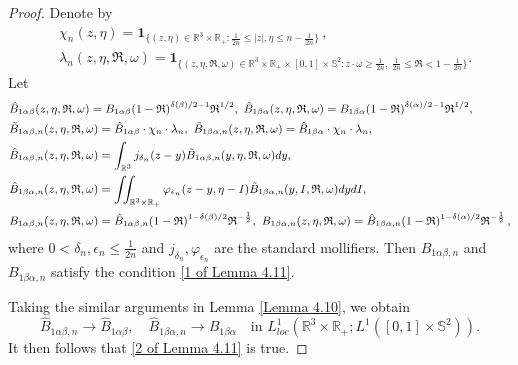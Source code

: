 \documentclass[reqno,11pt]{amsart}
\numberwithin{equation}{section}
\def\R{\mathbb{R}}
\begin{document}
\begin{proof}
	Denote by
	\begin{equation*}
    \begin{aligned}
		& \chi_n (z,\eta ) = \mathbf{1}_{ \{(z,\eta )\in \R^3 \times \R_+ :\frac{1}{2n}\leq |z|,\eta \leq n-\frac{1}{2n} \} } \,, \\
        & \lambda_n(z,\eta ,\mathfrak{R} ,\omega ) = \mathbf{1}_{ \{(z,\eta ,\mathfrak{R} ,\omega )\in \R^3 \times \R_+ \times [0,1] \times \mathbb{S}^2: z\cdot \omega \geq \frac{1}{2n},\ \frac{1}{2n}\leq \mathfrak{R}<1-\frac{1}{2n} \} }.
    \end{aligned}
	\end{equation*}
	Let
\begin{equation*}{\small
\begin{aligned}
  & \hat{B}_{1\alpha \beta}(z,\eta ,\mathfrak{R},\omega )=B_{1\alpha \beta} (1-\mathfrak{R})^{\delta(\beta )/2-1}\mathfrak{R}^{1/2}, \ \hat{B}_{1\beta \alpha}(z,\eta ,\mathfrak{R},\omega )=B_{1\beta \alpha}(1-\mathfrak{R})^{\delta(\alpha )/2-1}\mathfrak{R}^{1/2}, \\
  & \tilde{B}_{1\alpha \beta ,n} (z,\eta ,\mathfrak{R},\omega )=\hat{B}_{1\alpha \beta }\cdot \chi_n \cdot \lambda_n, \ \tilde{B}_{1\beta \alpha ,n} (z,\eta ,\mathfrak{R},\omega )=\hat{B}_{1\beta \alpha }\cdot \chi_n \cdot \lambda_n, \\ 
  & \hat{B}_{1\alpha \beta ,n }(z,\eta,\mathfrak{R},\omega ) =\int_{\R^3} j_{\delta_n }(z-y) \tilde{B}_{1\alpha \beta ,n}(y,\eta,\mathfrak{R},\omega )dy,\\ 
  & \hat{B}_{1\beta \alpha ,n }(z,\eta,\mathfrak{R},\omega ) =\iint_{\R^3 \times \R_+} \varphi_{\epsilon_n }(z-y,\eta-I) \tilde{B}_{1\beta \alpha ,n}(y,I,\mathfrak{R},\omega)dydI,\\
  & B_{1\alpha \beta,n}(z,\eta ,\mathfrak{R},\omega )=\hat{B}_{1\alpha \beta,n} (1-\mathfrak{R})^{1-\delta(\beta )/2}\mathfrak{R}^{-\frac{1}{2}},\ B_{1\beta \alpha,n}(z,\eta ,\mathfrak{R},\omega )=\hat{B}_{1\beta \alpha,n}(1-\mathfrak{R})^{1-\delta(\alpha )/2}\mathfrak{R}^{-\frac{1}{2}} \,, 
		\end{aligned}}
	\end{equation*}
	where $0< \delta_n,\epsilon_n \leq \frac{1}{2n} $ and $j_{\delta_n}, \varphi_{\epsilon_n}$ are the standard mollifiers. Then $B_{1\alpha \beta ,n }$ and $B_{1\beta \alpha ,n }$ satisfy the condition \eqref{1 of Lemma 4.11}. 

Taking the similar arguments in Lemma \ref{Lemma 4.10}, we obtain
	\begin{equation*}
		\hat{B}_{1\alpha \beta ,n } \rightarrow \hat{B}_{1\alpha \beta}, \quad
		\hat{B}_{1\beta \alpha ,n} \rightarrow \hat{B}_{1\beta \alpha } \quad \text{in }  L^1_{loc} (\R^3\times \R_+ ; L^1([0,1]\times \mathbb{S}^2 )).
	\end{equation*}
It then follows that \eqref{2 of Lemma 4.11} is true. 


\end{proof}
\end{document}
